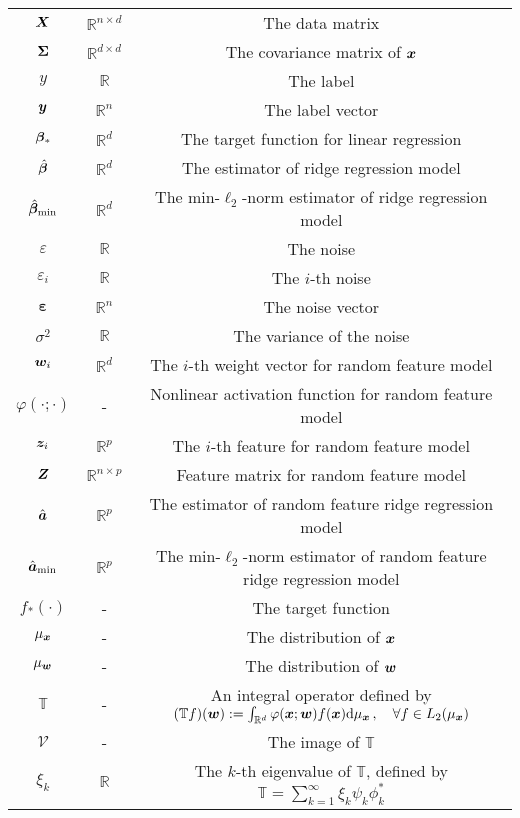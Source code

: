 \begin{table}[H]
\begin{threeparttable}
\begin{tabular}{c | c | c}
${\boldsymbol X}$ & $\mathbb{R}^{n \times d}$ & The data matrix\\
${\boldsymbol \Sigma}$ & $\mathbb{R}^{d \times d}$ & The covariance matrix of ${\boldsymbol x}$\\
$y$ & $\mathbb{R}$ & The label \\
${\boldsymbol y}$ & $\mathbb{R}^{n}$ & The label vector \\
${\boldsymbol \beta}_*$ & $\mathbb{R}^{d}$ & The target function for linear regression \\
$\hat{{\boldsymbol \beta}}$ & $\mathbb{R}^{d}$ & The estimator of ridge regression model \\
$\hat{{\boldsymbol \beta}}_{\min}$ & $\mathbb{R}^{d}$ & The min-$\ell_2$-norm estimator of ridge regression model \\
$\varepsilon$ & $\mathbb{R}$ & The noise \\
$\varepsilon_i$ & $\mathbb{R}$ & The $i$-th noise \\
$\bm\varepsilon$ & $\mathbb{R}^{n}$ & The noise vector \\
$\sigma^2$ & $\mathbb{R}$ & The variance of the noise\\ \midrule
${\boldsymbol w}_i$ & $\mathbb{R}^{d}$ & The $i$-th weight vector for random feature model \\ 
$\varphi(\cdot;\cdot)$ & - & Nonlinear activation function for random feature model \\
${\boldsymbol z}_i$ & $\mathbb{R}^{p}$ & The $i$-th feature for random feature model \\
${\boldsymbol Z}$ & $\mathbb{R}^{n \times p}$ & Feature matrix for random feature model \\
$\hat{{\boldsymbol a}}$ & $\mathbb{R}^{p}$ & The estimator of random feature ridge regression model\\
$\hat{{\boldsymbol a}}_{\min}$ & $\mathbb{R}^{p}$ & The min-$\ell_2$-norm estimator of random feature ridge regression model\\ \midrule
$f_*(\cdot)$ & - & The target function \\
$\mu_{\boldsymbol x}$ & - & The distribution of ${\boldsymbol x}$ \\
$\mu_{\boldsymbol w}$ & - & The distribution of ${\boldsymbol w}$ \\
$\mathbb{T}$ & - & An integral
operator defined by $(\mathbb{T}f)({\boldsymbol w}) := \int_{\mathbb{R}^d} \varphi({\boldsymbol x}; {\boldsymbol w}) f({\boldsymbol x}) \mathrm{d}\mu_{\boldsymbol x} \,,\quad \forall f \in L_2(\mu_{\boldsymbol x})$ \\
$\mathcal{V}$ & - & The image of $\mathbb{T}$\\
$\xi_k$ & $\mathbb{R}$ & The $k$-th eigenvalue of $\mathbb{T}$, defined by
$\mathbb{T} = \sum_{k=1}^\infty \xi_k \psi_k \phi_k^*$ \\

\end{tabular}
\end{threeparttable}
\end{table}
